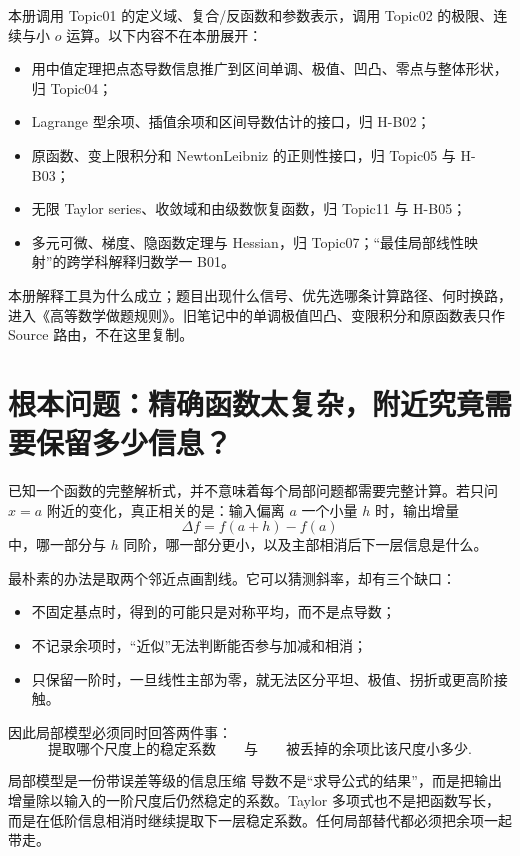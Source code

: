 \documentclass[11pt,a4paper]{ctexart}
\begin{document}
本册调用 Topic01 的定义域、复合/反函数和参数表示，调用 Topic02 的极限、连续与小 $o$ 运算。以下内容不在本册展开：
\begin{itemize}
  \item 用中值定理把点态导数信息推广到区间单调、极值、凹凸、零点与整体形状，归 Topic04；
  \item Lagrange 型余项、插值余项和区间导数估计的接口，归 H-B02；
  \item 原函数、变上限积分和 Newton\textendash{}Leibniz 的正则性接口，归 Topic05 与 H-B03；
  \item 无限 Taylor series、收敛域和由级数恢复函数，归 Topic11 与 H-B05；
  \item 多元可微、梯度、隐函数定理与 Hessian，归 Topic07；“最佳局部线性映射”的跨学科解释归数学一 B01。
\end{itemize}

本册解释工具为什么成立；题目出现什么信号、优先选哪条计算路径、何时换路，进入《高等数学做题规则》。旧笔记中的单调极值凹凸、变限积分和原函数表只作 Source 路由，不在这里复制。

\section{根本问题：精确函数太复杂，附近究竟需要保留多少信息？}

已知一个函数的完整解析式，并不意味着每个局部问题都需要完整计算。若只问 $x=a$ 附近的变化，真正相关的是：输入偏离 $a$ 一个小量 $h$ 时，输出增量
\[
\Delta f=f(a+h)-f(a)
\]
中，哪一部分与 $h$ 同阶，哪一部分更小，以及主部相消后下一层信息是什么。

最朴素的办法是取两个邻近点画割线。它可以猜测斜率，却有三个缺口：
\begin{itemize}
  \item 不固定基点时，得到的可能只是对称平均，而不是点导数；
  \item 不记录余项时，“近似”无法判断能否参与加减和相消；
  \item 只保留一阶时，一旦线性主部为零，就无法区分平坦、极值、拐折或更高阶接触。
\end{itemize}

因此局部模型必须同时回答两件事：
\[
\boxed{\text{提取哪个尺度上的稳定系数}}
\qquad\text{与}\qquad
\boxed{\text{被丢掉的余项比该尺度小多少}}.
\]

\begin{corebox}{局部模型是一份带误差等级的信息压缩}
导数不是“求导公式的结果”，而是把输出增量除以输入的一阶尺度后仍然稳定的系数。Taylor 多项式也不是把函数写长，而是在低阶信息相消时继续提取下一层稳定系数。任何局部替代都必须把余项一起带走。
\end{corebox}
\end{document}
